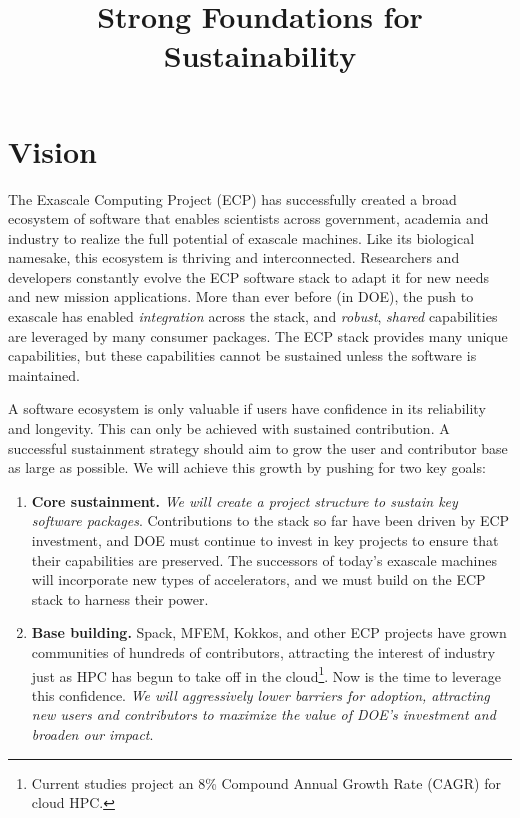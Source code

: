 \documentclass[11pt]{article}
\title{\vspace{-3em}\sf\huge\color{secblue}%
Strong Foundations for Sustainability}
\date{\vspace{-6em}}
\begin{document}
\setcounter{page}{1}

\maketitle

\section{Vision}

The Exascale Computing Project (ECP) has successfully created a broad ecosystem of
software that enables scientists across government, academia and industry to realize the
full potential of exascale machines. Like its biological namesake, this ecosystem is
thriving and interconnected. Researchers and developers constantly evolve the ECP
software stack to adapt it for new needs and new mission applications. More than ever
before (in DOE), the push to exascale has enabled {\it integration} across the stack,
and {\it robust}, {\it shared} capabilities are leveraged by many consumer packages. The
ECP stack provides many unique capabilities, but these capabilities cannot be sustained
unless the software is maintained.

A software ecosystem is only valuable if users have confidence in its reliability and
longevity. This can only be achieved with sustained contribution. A successful
sustainment strategy should aim to grow the user and contributor base as large as
possible. We will achieve this growth by pushing for two key goals:

\begin{enumerate}
\item {\bf Core sustainment.} {\it We will create a project structure to sustain key
  software packages}. Contributions to the stack so far have been driven by ECP
  investment, and DOE must continue to invest in key projects to ensure that their
  capabilities are preserved. The successors of today's exascale machines will
  incorporate new types of accelerators, and we must build on the ECP stack to harness
  their power.
\item {\bf Base building.} Spack, MFEM, Kokkos, and other ECP projects have grown
  communities of hundreds of contributors, attracting the interest of industry just as
  HPC has begun to take off in the cloud\footnote{Current studies project an 8\%
  Compound Annual Growth Rate (CAGR) for cloud HPC.}. Now is the time to leverage this
  confidence. {\it We will aggressively lower barriers for adoption, attracting new
    users and contributors to maximize the value of DOE's investment and broaden our
    impact}.
\end{enumerate}
\end{document}
